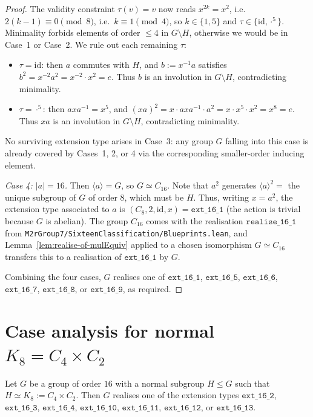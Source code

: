 \begin{proof}
  The validity constraint $\tau(v) = v$ now reads $x^{2k} = x^2$, i.e.\
  $2(k - 1) \equiv 0 \pmod 8$, i.e.\ $k \equiv 1 \pmod 4$, so
  $k \in \{1, 5\}$ and $\tau \in \{\mathrm{id}, \cdot^5\}$.
  Minimality forbids elements of order $\le 4$ in $G \setminus H$, otherwise
  we would be in Case~1 or Case~2. We rule out each remaining $\tau$:
  \begin{itemize}
    \item $\tau = \mathrm{id}$: then $a$ commutes with $H$, and $b := x^{-1}
    a$ satisfies $b^2 = x^{-2} a^2 = x^{-2} \cdot x^2 = e$. Thus $b$ is an
    involution in $G \setminus H$, contradicting minimality.
    \item $\tau = \cdot^5$: then $a x a^{-1} = x^5$, and $(xa)^2 = x \cdot
    a x a^{-1} \cdot a^2 = x \cdot x^5 \cdot x^2 = x^8 = e$. Thus $xa$ is an
    involution in $G \setminus H$, contradicting minimality.
  \end{itemize}
  No surviving extension type arises in Case~3: any group $G$ falling into
  this case is already covered by Cases~1, 2, or 4 via the corresponding
  smaller-order inducing element.

  \smallskip
  \noindent
  \emph{Case 4: $|a| = 16$.} Then $\langle a \rangle = G$, so $G \simeq
  C_{16}$. Note that $a^2$ generates $\langle a \rangle^2 = $ the unique
  subgroup of $G$ of order $8$, which must be $H$. Thus, writing $x = a^2$,
  the extension type associated to $a$ is
  $(C_8, 2, \mathrm{id}, x) = \mathtt{ext\_16\_1}$ (the action is trivial
  because $G$ is abelian). The group $C_{16}$ comes with the realisation
  $\mathtt{realise\_16\_1}$ from
  \texttt{M2rGroup7/SixteenClassification/Blueprints.lean}, and
  Lemma~\ref{lem:realise-of-mulEquiv} applied to a chosen isomorphism
  $G \simeq C_{16}$ transfers this to a realisation of $\mathtt{ext\_16\_1}$
  by $G$.

  \smallskip
  Combining the four cases, $G$ realises one of $\mathtt{ext\_16\_1}$,
  $\mathtt{ext\_16\_5}$, $\mathtt{ext\_16\_6}$, $\mathtt{ext\_16\_7}$,
  $\mathtt{ext\_16\_8}$, or $\mathtt{ext\_16\_9}$, as required.
\end{proof}

\section{Case analysis for normal \texorpdfstring{$K_8 = C_4 \times C_2$}{K8 = C4 x C2}}

\begin{lemma}
  \label{lem:realise-with-normal-K8}
  Let $G$ be a group of order $16$ with a normal subgroup $H \le G$ such that
  $H \simeq K_8 := C_4 \times C_2$. Then $G$ realises one of the extension
  types $\mathtt{ext\_16\_2}$, $\mathtt{ext\_16\_3}$, $\mathtt{ext\_16\_4}$,
  $\mathtt{ext\_16\_10}$, $\mathtt{ext\_16\_11}$, $\mathtt{ext\_16\_12}$, or
  $\mathtt{ext\_16\_13}$.
\end{lemma}

